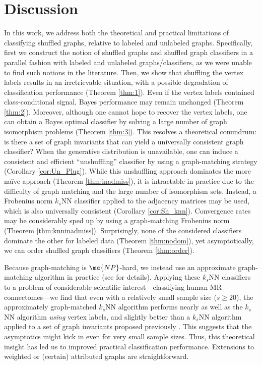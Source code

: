 \documentclass[10pt,journal,cspaper,compsoc]{IEEEtran}
\begin{document}
\section{Discussion}

In this work, we address both the theoretical and practical limitations of classifying shuffled graphs, relative to labeled and unlabeled graphs.  Specifically, first we construct the notion of shuffled graphs and shuffled graph classifiers in a parallel fashion with labeled and unlabeled graphs/classifiers, as we were unable to find such notions in the literature.  Then, we show that shuffling the vertex labels results in an irretrievable situation, with a possible degradation of classification performance (Theorem \ref{thm:1}). Even if the vertex labels contained class-conditional signal, Bayes performance may remain unchanged (Theorem \ref{thm:2}).  Moreover, although one cannot hope to recover the vertex labels, one can obtain a Bayes optimal classifier by solving a large number of graph isomorphism problems (Theorem \ref{thm:3}).  This resolves a theoretical conundrum: is there a set of graph invariants that can yield a universally consistent graph classifier?  When the generative distribution is unavailable, one can induce a consistent and efficient ``unshuffling'' classifier by using a graph-matching strategy (Corollary \ref{cor:Un_Plug}).  While this unshuffling approach dominates the more na\"ive approach (Theorem \ref{thm:inadmiss}), it is intractable in practice due to the difficulty of graph matching and the large number of isomorphism sets.  Instead, a Frobenius norm $k_s$NN classifier applied to the adjacency matrices may be used, which is also universally consistent (Corollary \ref{cor:Sh_knn}).  Convergence rates may be considerably sped up by using a graph-matching Frobenius norm (Theorem \ref{thm:knninadmiss}).  Surprisingly, none of the considered classifiers dominate the other for labeled data (Theorem \ref{thm:nodom}), yet asymptotically, we can order shuffled graph classifiers (Theorem \ref{thm:order}).

Because graph-matching is $\mc{NP}$-hard, we instead use an approximate graph-matching algorithm in practice (see \cite{VP11_QAP} for details).  Applying these $k_s$NN classifiers to a problem of considerable scientific interest---classifying human MR connectomes---we find that even with a relatively small sample size ($s \geq 20$), the approximately graph-matched $k_s$NN algorithm performs nearly as well as the $k_s$NN algorithm \emph{using} vertex labels, and slightly better than a $k_s$NN algorithm applied to a set of graph invariants proposed previously \cite{PCP10}.  This suggests that the asymptotics might kick in even for very small sample sizes.  Thus, this theoretical insight has led us to improved practical classification performance.  Extensions to weighted or (certain) attributed graphs are straightforward.
\end{document}
